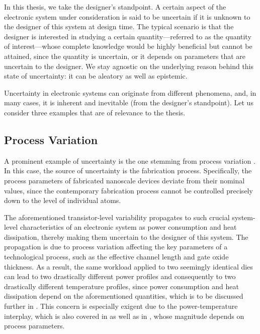 In this thesis, we take the designer's standpoint. A certain aspect of the
electronic system under consideration is said to be uncertain if it is unknown
to the designer of this system at design time. The typical scenario is that the
designer is interested in studying a certain quantity---referred to as the
quantity of interest---whose complete knowledge would be highly beneficial but
cannot be attained, since the quantity \perse is uncertain, or it depends on
parameters that are uncertain to the designer. We stay agnostic on the
underlying reason behind this state of uncertainty: it can be aleatory as well
as epistemic.

Uncertainty in electronic systems can originate from different phenomena, and,
in many cases, it is inherent and inevitable (from the designer's standpoint).
Let us consider three examples that are of relevance to the thesis.

\subsection{Process Variation}

A prominent example of uncertainty is the one stemming from process variation
\cite{chandrakasan2000, srivastava2010}. In this case, the source of uncertainty
is the fabrication process. Specifically, the process parameters of fabricated
nanoscale devices deviate from their nominal values, since the contemporary
fabrication process cannot be controlled precisely down to the level of
individual atoms.

The aforementioned transistor-level variability propagates to such crucial
system-level characteristics of an electronic system as power consumption and
heat dissipation, thereby making them uncertain to the designer of this system.
The propagation is due to process variation affecting the key parameters of a
technological process, such as the effective channel length and gate oxide
thickness. As a result, the same workload applied to two seemingly identical
dies can lead to two drastically different power profiles and consequently to
two drastically different temperature profiles, since power consumption and heat
dissipation depend on the aforementioned quantities, which is to be discussed
further in . This concern is especially exigent due to the
power-temperature interplay, which is also covered in  as well
as in , whose magnitude depends on process parameters.

